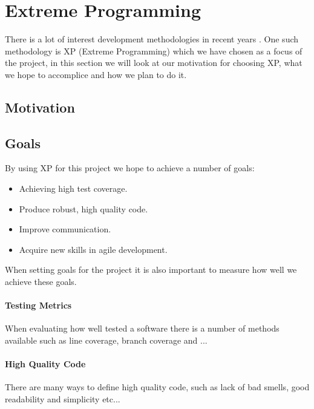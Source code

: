 \section{Extreme Programming}
There is a lot of interest development methodologies in recent years . One such methodology is XP (Extreme Programming) which we have chosen as a focus of the project, in this section we will look at our motivation for choosing XP, what we hope to accomplice and how we plan to do it.
	
\subsection{Motivation}

\subsection{Goals}
By using XP for this project we hope to achieve a number of goals:
\begin{itemize}
\item Achieving high test coverage.
\item Produce robust, high quality code.
\item Improve communication.
\item Acquire new skills in agile development.
\end{itemize}

When setting goals for the project it is also important to measure how well we achieve these goals. 
\paragraph{Testing Metrics}
When evaluating how well tested a software there is a number of methods available such as line coverage, branch coverage and ...

\paragraph{High Quality Code}
There are many ways to define high quality code, such as lack of bad smells, good readability and simplicity etc...


